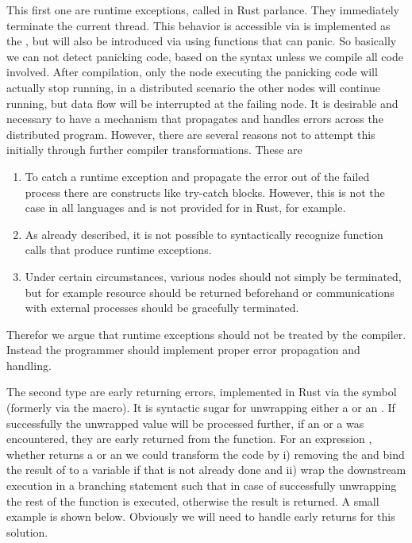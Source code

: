This first one are runtime exceptions, called  in Rust parlance. They immediately terminate the current thread. This behavior is accessible via is implemented as the , but will also be introduced via using functions that can panic. So basically we can not detect panicking code, based on the syntax unless we compile all code involved. After compilation, only the node executing the panicking code will actually stop running, in a distributed scenario the other nodes will continue running, but data flow will be interrupted at the failing node. It is desirable and necessary to have a mechanism that propagates and handles errors across the distributed program. However, there are several reasons not to attempt this initially through further compiler transformations. These are
\begin{enumerate}
    \item To catch a runtime exception and propagate the error out of the failed process there are constructs like try-catch blocks. However, this is not the case in all languages and is not provided for in Rust, for example.
    \item As already described, it is not possible to syntactically recognize function calls that produce runtime exceptions.
    \item Under certain circumstances, various nodes should not simply be terminated, but for example resource should be returned beforehand or communications with external processes should be gracefully terminated.
\end{enumerate}
Therefor we argue that runtime exceptions should not be treated by the compiler. Instead the programmer should implement proper error propagation and handling. 

The second type are early returning errors, implemented in Rust via the   symbol (formerly via the  macro). It is syntactic sugar for unwrapping either a  or an . If successfully the unwrapped value will be processed further, if an  or a  was encountered, they are early returned from the function. For an expression , whether  returns a  or an  we could transform the code by i) removing the  and bind the result of  to a variable if that is not already done and ii) wrap the downstream execution in a branching statement such that in case of successfully unwrapping the rest of the function is executed, otherwise the result is returned. A small example is shown below. Obviously we will need to handle early returns for this solution.

